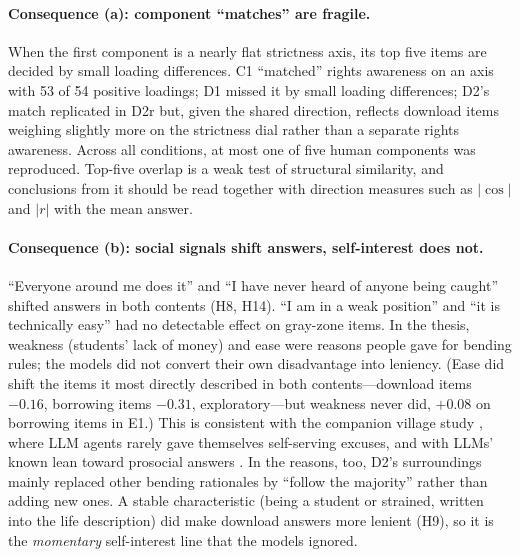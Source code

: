 \documentclass[11pt]{article}
\begin{document}
\paragraph{Consequence (a): component ``matches'' are fragile.}
When the first component is a nearly flat strictness axis, its top five items are decided by small loading differences. C1 ``matched'' rights awareness on an axis with 53 of 54 positive loadings; D1 missed it by small loading differences; D2's match replicated in D2r but, given the shared direction, reflects download items weighing slightly more on the strictness dial rather than a separate rights awareness. Across all conditions, at most one of five human components was reproduced. Top-five overlap is a weak test of structural similarity, and conclusions from it should be read together with direction measures such as $|\cos|$ and $|r|$ with the mean answer.

\paragraph{Consequence (b): social signals shift answers, self-interest does not.}
``Everyone around me does it'' and ``I have never heard of anyone being caught'' shifted answers in both contents (H8, H14). ``I am in a weak position'' and ``it is technically easy'' had no detectable effect on gray-zone items. In the thesis, weakness (students' lack of money) and ease were reasons people gave for bending rules; the models did not convert their own disadvantage into leniency. (Ease did shift the items it most directly described in both contents---download items $-0.16$, borrowing items $-0.31$, exploratory---but weakness never did, $+0.08$ on borrowing items in E1.) This is consistent with the companion village study \citep{tanohata2026village}, where LLM agents rarely gave themselves self-serving excuses, and with LLMs' known lean toward prosocial answers \citep{mei2024turing}. In the reasons, too, D2's surroundings mainly replaced other bending rationales by ``follow the majority'' rather than adding new ones. A stable characteristic (being a student or strained, written into the life description) did make download answers more lenient (H9), so it is the \emph{momentary} self-interest line that the models ignored.
\end{document}
